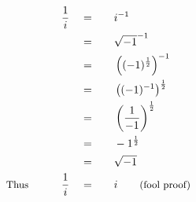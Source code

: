 \begin{alignat*}{5}
&\,&\frac{1}{i}\quad&=\quad&&i^{-1}\\
&\,&\,&=&&\sqrt{-1}^{-1}\\
&\,&\,&=&&\left((-1)^\frac{1}{2}\right)^{-1}\\
&\,&\,&=&&\left((-1)^{-1}\right)^\frac{1}{2}\\
&\,&\,&=&&\left(\frac{1}{-1}\right)^\frac{1}{2}\\
&\,&\,&=&&-1^\frac{1}{2}\\
&\,&\,&=&&\sqrt{-1}\\
&\small\text{Thus}\normalsize\qquad&\frac{1}{i}\quad&=&& i\qquad\small\text{(fool proof)}
\end{alignat*}
